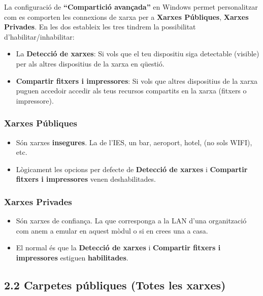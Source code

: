 \documentclass[
  a4paper,
]{article}
\providecommand{\tightlist}{%
  \setlength{\itemsep}{0pt}\setlength{\parskip}{0pt}}
\begin{document}
La configuració de \textbf{``Compartició avançada''} en Windows permet
personalitzar com es comporten les connexions de xarxa per a
\textbf{Xarxes Públiques}, \textbf{Xarxes Privades}. En les dos
estableix les tres tindrem la possibilitat d'habilitar/inhabilitar:

\begin{itemize}
\tightlist
\item
  La \textbf{Detecció de xarxes}: Si vols que el teu dispositiu siga
  detectable (visible) per als altres dispositius de la xarxa en
  qüestió.
\item
  \textbf{Compartir fitxers i impressores}: Si vols que altres
  dispositius de la xarxa puguen accedoir accedir als teus recursos
  compartits en la xarxa (fitxers o impressore).
\end{itemize}

\subsubsection{\texorpdfstring{\textbf{Xarxes
Públiques}}{Xarxes Públiques}}\label{xarxes-puxfabliques}

\begin{itemize}
\tightlist
\item
  Són xarxes \textbf{insegures}. La de l'IES, un bar, aeroport, hotel,
  (no sols WIFI), etc.
\item
  Lògicament les opcions per defecte de \textbf{Detecció de xarxes} i
  \textbf{Compartir fitxers i impressores} venen deshabilitades.
\end{itemize}

\subsubsection{\texorpdfstring{\textbf{Xarxes
Privades}}{Xarxes Privades}}\label{xarxes-privades}

\begin{itemize}
\tightlist
\item
  Són xarxes de confiança. La que corresponga a la LAN d'una
  organització com anem a emular en aquest mòdul o si en crees una a
  casa.
\item
  El normal és que la \textbf{Detecció de xarxes} i \textbf{Compartir
  fitxers i impressores} estiguen \textbf{habilitades}.
\end{itemize}

\subsection{2.2 Carpetes públiques (Totes les
xarxes)}\label{carpetes-puxfabliques-totes-les-xarxes}
\end{document}
